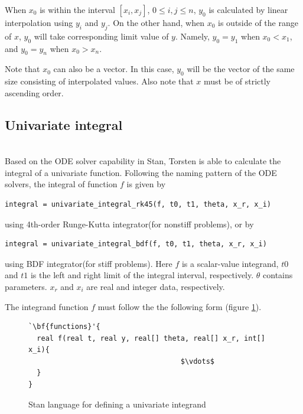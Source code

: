 \documentclass[11pt]{amsart}
\newenvironment{fmpage}[1]
     {\begin{lrbox}{\fmbox}\begin{minipage}{#1}}
     {\end{minipage}\end{lrbox}\fbox{\usebox{\fmbox}}}
\begin{document}
When $x_0$ is within the interval $[x_i, x_j]$,
$0\le i, j \le n$, $y_0$ is calculated by linear
interpolation using $y_i$ and $y_j$. On the other hand,
when $x_0$ is outside of the range of $x$, $y_0$ will take
corresponding limit value of $y$. Namely, $y_0 = y_1$ when
$x_0<x_1$, and $y_0=y_n$ when $x_0 > x_n$.

Note that $x_0$ can also be a vector. In this case, $y_0$ will be
the vector of the same size consisting of interpolated values.
Also note that $x$ must be of strictly ascending order. 


\subsection{Univariate integral} \ \\
Based on the ODE solver capability in Stan, Torsten is able
to calculate the integral of a univariate
function. Following the naming pattern of the ODE
solvers, the integral of function $f$ is given by

\begin{verbatim}
integral = univariate_integral_rk45(f, t0, t1, theta, x_r, x_i)
\end{verbatim}
using 4th-order Runge-Kutta integrator(for nonstiff problems), or by

\begin{verbatim}
integral = univariate_integral_bdf(f, t0, t1, theta, x_r, x_i)
\end{verbatim}
using BDF integrator(for stiff problems). Here $f$ is a
scalar-value integrand, $t0$ and $t1$ is the left and right
limit of the integral interval, respectively. $\theta$ contains 
parameters. $x_r$ and $x_i$ are real and integer data,
respectively. 

The integrand function $f$ must follow the the following
form (figure \ref{fig:univariate_integrand}).
\begin{figure}[htbp]
\caption{Stan language for defining a univariate integrand}
\begin{center}
\begin{small}
\begin{fmpage}{\textwidth - .75in}
\begin{lstlisting}[basicstyle=\footnotesize\ttfamily,mathescape=true,flexiblecolumns=true,frame=single,escapeinside=`']
`\bf{functions}'{
  real f(real t, real y, real[] theta, real[] x_r, int[] x_i){
                                    $\vdots$			       
  }
}
\end{lstlisting}
\end{fmpage}
\end{small}
\end{center}
\label{fig:univariate_integrand}
\end{figure}
\end{document}
